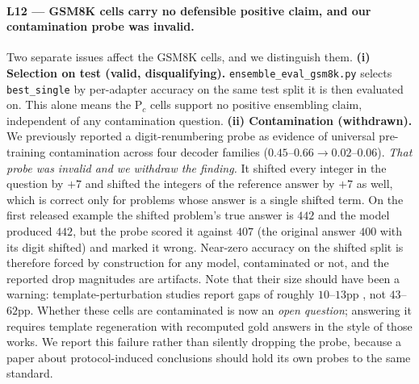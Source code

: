 \documentclass[11pt]{article}
\begin{document}
\paragraph{L12 — GSM8K cells carry no defensible positive claim, and our contamination probe was invalid.} Two separate issues affect the GSM8K cells, and we distinguish them. \textbf{(i) Selection on test (valid, disqualifying).} \texttt{ensemble\_\allowbreak eval\_\allowbreak gsm8k.\allowbreak py} selects \texttt{best\_single} by per-adapter accuracy on the same test split it is then evaluated on. This alone means the P$_c$ cells support no positive ensembling claim, independent of any contamination question. \textbf{(ii) Contamination (withdrawn).} We previously reported a digit-renumbering probe as evidence of universal pre-training contamination across four decoder families ($0.45$--$0.66 \to 0.02$--$0.06$). \emph{That probe was invalid and we withdraw the finding.} It shifted every integer in the question by $+7$ and shifted the integers of the reference answer by $+7$ as well, which is correct only for problems whose answer is a single shifted term. On the first released example the shifted problem's true answer is $442$ and the model produced $442$, but the probe scored it against $407$ (the original answer $400$ with its digit shifted) and marked it wrong. Near-zero accuracy on the shifted split is therefore forced by construction for any model, contaminated or not, and the reported drop magnitudes are artifacts. Note that their size should have been a warning: template-perturbation studies report gaps of roughly $10$--$13$pp \citep{mirzadeh2024gsmsymbolic, zhang2024gsm1k}, not $43$--$62$pp. Whether these cells are contaminated is now an \emph{open question}; answering it requires template regeneration with recomputed gold answers in the style of those works. We report this failure rather than silently dropping the probe, because a paper about protocol-induced conclusions should hold its own probes to the same standard.
\end{document}
